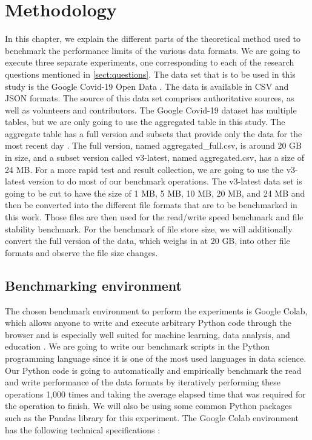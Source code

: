 \section{Methodology}
\label{sec:method}
In this chapter, we explain the different parts of the theoretical method used to benchmark the performance limits of the various data formats. We are going to execute three separate experiments, one corresponding to each of the research questions mentioned in \ref{sect:questions}. The data set that is to be used in this study is the Google Covid-19 Open Data \cite{noauthor_covid-19_nodate}. The data is available in \gls{CSV} and JSON formats. The source of this data set comprises authoritative sources, as well as volunteers and contributors. The Google Covid-19 dataset has multiple tables, but we are only going to use the aggregated table in this study. The aggregate table has a full version and subsets that provide only the data for the most recent day \cite{noauthor_covid-19_nodate}. The full version, named aggregated\_full.csv, is around 20 GB in size, and a subset version called v3-latest, named aggregated.csv, has a size of 24 MB. For a more rapid test and result collection, we are going to use the v3-latest version to do most of our benchmark operations. The v3-latest data set is going to be cut to have the size of 1 MB, 5 MB, 10 MB, 20 MB, and 24 MB and then be converted into the different file formats that are to be benchmarked in this work. Those files are then used for the read/write speed benchmark and file stability benchmark. For the benchmark of file store size, we will additionally convert the full version of the data, which weighs in at 20 GB, into other file formats and observe the file size changes. 


\subsection{Benchmarking environment}
The chosen benchmark environment to perform the experiments is Google Colab, which allows anyone to write and execute arbitrary Python code through the browser and is especially well suited for machine learning, data analysis, and education \cite{noauthor_google_2022}. We are going to write our benchmark scripts in the Python programming language since it is one of the most used languages in data science. Our Python code is going to automatically and empirically benchmark the read and write performance of the data formats by iteratively performing these operations 1,000 times and taking the average elapsed time that was required for the operation to finish. We will also be using some common Python packages such as the Pandas library for this experiment. The Google Colab environment has the following technical specifications \cite{noauthor_google_2022}:


